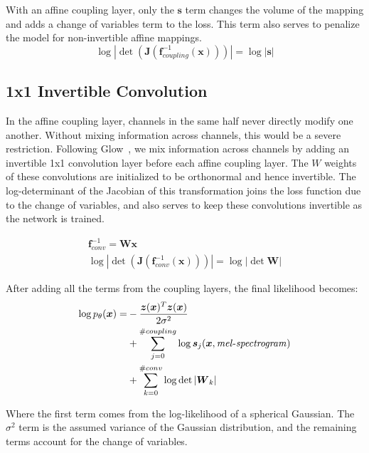 With an affine coupling layer, only the $\boldsymbol{s}$ term changes the volume of the mapping and adds a change of variables term to the loss. This term also serves to penalize the model for non-invertible affine mappings.
\begin{equation}
\log |\det(\boldsymbol{J}(\boldsymbol{f}_{coupling}^{-1}(\boldsymbol{x})))| = \log |\boldsymbol{s}|
\end{equation}

\subsection{1x1 Invertible Convolution}
In the affine coupling layer, channels in the same half never directly modify one another.  Without mixing information across channels, this would be a severe restriction. Following Glow~\cite{kingma2018glow}, we mix information across channels by adding an invertible 1x1 convolution layer before each affine coupling layer.  The $W$ weights of these convolutions are initialized to be orthonormal and hence invertible. The log-determinant of the Jacobian of this transformation joins the loss function due to the change of variables, and also serves to keep these convolutions invertible as the network is trained.

\begin{gather}
    \boldsymbol{f}_{conv}^{-1} = \boldsymbol{W} \boldsymbol{x} \\
    \log |\det(\boldsymbol{J}(\boldsymbol{f}_{conv}^{-1}(\boldsymbol{x})))| = \log |\det{\boldsymbol{W}}|
\end{gather}

After adding all the terms from the coupling layers, the final likelihood becomes:
\begin{equation}
\begin{split}
    \log{p_\theta(\boldsymbol{x})} =& -\frac{\boldsymbol{z}(\boldsymbol{x})^{T}\boldsymbol{z}(\boldsymbol{x})}{2\sigma^2} \\
    &+ \sum_{j=0}^{\#coupling}\log \boldsymbol{s}_j(\boldsymbol{x},\mathit{mel\textnormal{-}spectrogram}) \\
    &+ \sum_{k=0}^{\#conv} \log \det |\boldsymbol{W}_k|
\end{split}
\end{equation}

Where the first term comes from the log-likelihood of a spherical Gaussian.  The $\sigma^2$ term is the assumed variance of the Gaussian distribution, and the remaining terms account for the change of variables.

